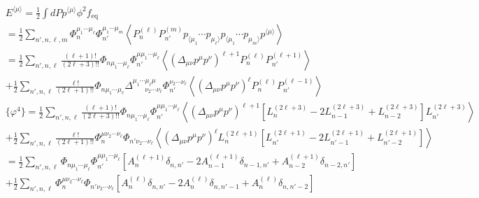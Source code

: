 \documentclass[aps,prd,preprint,nofootinbib,amsmath,amssymb,showpacs,longbibliography,singlecolumn,superscriptaddress,10pt]{revtex4-1}
\theoremstyle{plain}
\theoremstyle{definition}
\begin{document}
\begin{equation}
\begin{aligned}
&
E^{\langle \mu \rangle} = \frac{1}{2} \int dP p^{\langle \mu \rangle} \phi^2 f_{\mathrm{eq}}
\\
&
=
\frac{1}{2}
\sum_{n',n,\ell,m}  \Phi_{n}^{\mu_{1} \cdots \mu_{\ell}} \Phi_{n'}^{ \mu_{1} \cdots \mu_{m}} \left\langle P_{n}^{(\ell)} P_{n'}^{(m)} p_{\langle \mu_{1}} \cdots p_{ \mu_{\ell} \rangle} 
p_{\langle \mu_{1}} \cdots p_{ \mu_{m} \rangle} 
 p^{\langle \mu \rangle}\right\rangle
 \\
 &
=
\frac{1}{2}
\sum_{n',n,\ell} \frac{(\ell+1)!}{(2\ell +3)!!} \Phi_{n \mu_{1} \cdots \mu_{\ell}} \Phi_{n'}^{\mu \mu_{1} \cdots \mu_{\ell}} \left\langle \left(\Delta_{\mu \nu} p^{\mu} p^{\nu}\right)^{\ell + 1} P_{n}^{(\ell)} P_{n'}^{(\ell + 1)}  
 \right\rangle
\\
&
+
\frac{1}{2}
\sum_{n',n,\ell}\frac{\ell !}{(2\ell + 1)!!} \Phi_{n\mu_{1} \cdots \mu_{\ell}}
\Delta^{\mu_{1} \cdots \mu_{\ell} \mu}_{ \ \ \ \ \ \ \ \ \nu_{2} \cdots \nu_{\ell}}
\Phi_{n'}^{ \nu_{2} \cdots \nu_{\ell}} \left\langle \left(\Delta_{\mu \nu} p^{\mu} p^{\nu}\right)^{\ell} P_{n}^{(\ell)} P_{n'}^{(\ell-1)}  
 \right\rangle
\\
&
\{ \varphi^{4} \}
=
\frac{1}{2}
\sum_{n',n,\ell} \frac{(\ell+1)!}{(2\ell +3)!!} \Phi_{n \mu_{1} \cdots \mu_{\ell}} \Phi_{n'} ^{\mu \mu_{1} \cdots \mu_{\ell}} \left\langle \left(\Delta_{\mu \nu} p^{\mu} p^{\nu}\right)^{\ell + 1} [L_{n}^{(2\ell +3)} 
-
2 L_{n-1}^{(2\ell +3)}
+
L_{n-2}^{(2\ell +3)}] L_{n'}^{(2\ell + 3)}  
 \right\rangle
\\
&
+
\frac{1}{2}
\sum_{n',n,\ell}\frac{\ell !}{(2\ell + 1)!!} \Phi_{n}^{\mu \nu_{2} \cdots \nu_{\ell}}
\Phi_{n' \nu_{2} \cdots \nu_{\ell}} \left\langle \left(\Delta_{\mu \nu} p^{\mu} p^{\nu}\right)^{\ell} L_{n}^{(2\ell +1)} [L_{n'}^{(2\ell +1)} 
-
2 L_{n'-1}^{(2\ell +1)}
+
L_{n'-2}^{(2\ell +1)}]  
 \right\rangle
 \\
&
=
\frac{1}{2}
\sum_{n',n,\ell}  \Phi_{n \mu_{1} \cdots \mu_{\ell}} \Phi_{n'} ^{\mu \mu_{1} \cdots \mu_{\ell}} \left[
A_{n}^{(\ell+1)}\delta_{n,n'}
-
2 A_{n-1}^{(\ell+1)}\delta_{n-1,n'}
+
A_{n-2}^{(\ell+1)}\delta_{n-2,n'}
\right] 
\\
&
+
\frac{1}{2}
\sum_{n',n,\ell} \Phi_{n}^{\mu \nu_{2} \cdots \nu_{\ell}}
\Phi_{n' \nu_{2} \cdots \nu_{\ell}} 
\left[
A_{n}^{(\ell)}\delta_{n,n'}
-
2 A_{n}^{(\ell)}\delta_{n,n'-1}
+
A_{n}^{(\ell)}\delta_{n,n'-2}
\right] 
\end{aligned}    
\end{equation}
\end{document}
